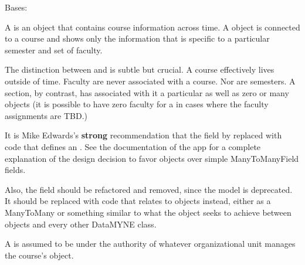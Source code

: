 \documentclass[letterpaper,10pt,english]{sphinxmanual}
\begin{document}

\begin{fulllineitems}
\label{generated/apps.profiles.models:apps.profiles.models.Course}
Bases: {\hyperref[generated/apps.profiles.models:apps.profiles.models.BaseModel]{}}

A  is an object that contains course information across time. A
 object is connected to a course and shows only the information
that is specific to a particular semester and set of faculty.

The distinction between  and  is subtle but crucial.
A course effectively lives outside of time.  Faculty are never associated
with a course.  Nor are semesters.  A section, by contrast, has associated
with it a particular  as well as zero or many 
objects (it is possible to have zero faculty for a  in cases 
where the faculty assignments are TBD.)

It is Mike Edwards's \textbf{strong} recommendation that the  field
by replaced with code that defines an .  See the documentation
of the  app for a complete explanation of the design decision
to favor  objects over simple ManyToManyField fields.

Also, the  field should be refactored and removed, since the 
 model is deprecated.  It should be replaced with code that
relates to  objects instead, either as a ManyToMany or something
similar to what the  object seeks to achieve between
 objects and every other DataMYNE class.


\begin{fulllineitems}
\label{generated/apps.profiles.models:apps.profiles.models.Course.get_unit}
A  is assumed to be under the authority of whatever
organizational unit manages the course's  object.

\end{fulllineitems}




\end{fulllineitems}
\end{document}
